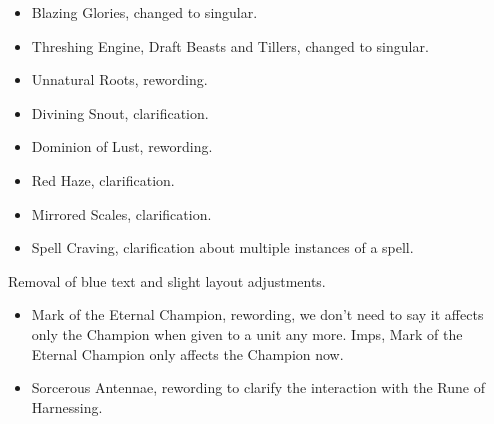 

\subtitle{2.2.2}

\begin{itemize}
\item Blazing Glories, changed to singular.
\item Threshing Engine, Draft Beasts and Tillers, changed to singular.
\item Unnatural Roots, rewording.
\item Divining Snout, clarification.
\item Dominion of Lust, rewording.
\item Red Haze, clarification.
\item Mirrored Scales, clarification.
\item Spell Craving, clarification about multiple instances of a spell.
\end{itemize}

\subtitle{2.2.1}

Removal of blue text and slight layout adjustments.

\subtitle{2.2}

\subtitle{Clarification and Corrections}

\begin{itemize}
\item Mark of the Eternal Champion, rewording, we don't need to say it affects only the Champion when given to a unit any more. Imps, Mark of the Eternal Champion only affects the Champion now.
\item Sorcerous Antennae, rewording to clarify the interaction with the Rune of Harnessing.
\end{itemize}

\subtitle{Rules changes}

